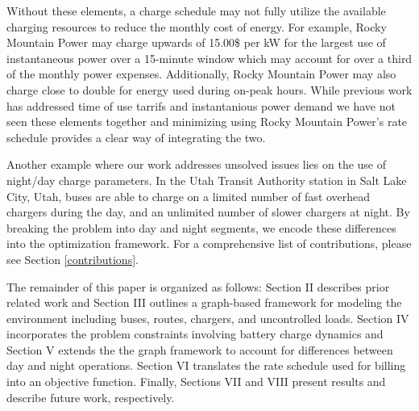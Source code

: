 \par Without these elements, a charge schedule may not fully utilize the available charging resources to reduce the monthly cost of energy.  For example, Rocky Mountain Power may charge upwards of 15.00\$ per kW for the largest use of instantaneous power over a 15-minute window which may account for over a third of the monthly power expenses. Additionally, Rocky Mountain Power may also charge close to double for energy used during on-peak hours.  While previous work has addressed time of use tarrifs \cite{Zhou_2020_Collaborative} and instantanious power demand \cite{qin_numerical_2016} we have not seen these elements together and minimizing using Rocky Mountain Power's rate schedule provides a clear way of integrating the two.
\par Another example where our work addresses unsolved issues lies on the use of night/day charge parameters.  In the Utah Transit Authority station in Salt Lake City, Utah, buses are able to charge on a limited number of fast overhead chargers during the day, and an unlimited number of slower chargers at night.  By breaking the problem into day and night segments, we encode these differences into the optimization framework. For a comprehensive list of contributions, please see Section \ref{contributions}.

\par The remainder of this paper is organized as follows: Section II describes prior related work and Section III outlines a graph-based framework for modeling the environment including buses, routes, chargers, and uncontrolled loads. Section IV incorporates the problem constraints involving battery charge dynamics and Section V extends the the graph framework to account for differences between day and night operations.  Section VI translates the rate schedule used for billing into an objective function. Finally, Sections VII and VIII present results and describe future work, respectively.
